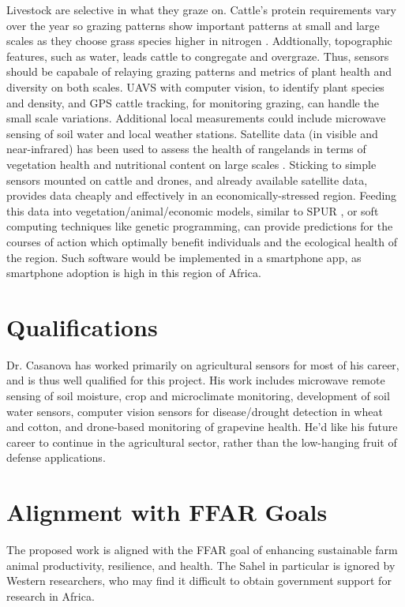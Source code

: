 \documentclass[11pt,letterpaper]{article}
\newcommand{\required}[1]{\section*{\hfil #1\hfil}}                    %
\begin{document}
Livestock are selective in what they graze on. Cattle's protein requirements vary over the year so grazing patterns show important patterns at small and large scales as they choose grass species higher in nitrogen \cite{coughenour1991spatial}. Addtionally, topographic features, such as water, leads cattle to congregate and overgraze. Thus, sensors should be capabale of relaying grazing patterns and metrics of plant health and diversity on both scales. UAVS with computer vision, to identify plant species and density, and GPS cattle tracking, for monitoring grazing, can handle the small scale variations. Additional local measurements could include microwave sensing of soil water and local weather stations. Satellite data (in visible and near-infrared) has been used to assess the health of rangelands in terms of vegetation health and nutritional content on large scales \cite{knox2012remote}. Sticking to simple sensors mounted on cattle and drones, and already available satellite data, provides data cheaply and effectively in an economically-stressed region. Feeding this data into vegetation/animal/economic models, similar to SPUR \cite{carlson1996comprehensive}, or soft computing techniques like genetic programming, can provide predictions for the courses of action which optimally benefit individuals and the ecological health of the region. Such software would be implemented in a smartphone app, as smartphone adoption is high in this region of Africa.

\required{Qualifications}
Dr. Casanova has worked primarily on agricultural sensors for most of his career, and is thus well qualified for this project. His work includes microwave remote sensing of soil moisture, crop and microclimate monitoring, development of soil water sensors, computer vision sensors for disease/drought detection in wheat and cotton, and drone-based monitoring of grapevine health. He'd like his future career to continue in the agricultural sector, rather than the low-hanging fruit of defense applications.   

\required{Alignment with FFAR Goals}

The proposed work is aligned with the FFAR goal of enhancing sustainable farm animal productivity, resilience, and health. The Sahel in particular is ignored by Western researchers, who may find it difficult to obtain government support for research in Africa.


\end{document}
